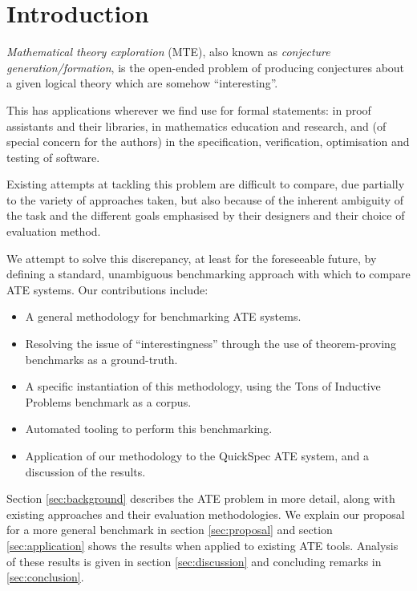 \section{Introduction}
\label{intro}


\emph{Mathematical theory exploration} (MTE), also known as
\emph{conjecture generation/formation}, is the open-ended problem of producing
conjectures about a given logical theory which are somehow ``interesting''.

This has applications wherever we find use for formal statements: in proof
assistants and their libraries, in mathematics education and research, and
(of special concern for the authors) in the specification, verification,
optimisation and testing of software.

Existing attempts at tackling this problem are difficult to compare, due
partially to the variety of approaches taken, but also because of the inherent
ambiguity of the task and the different goals emphasised by their designers and
their choice of evaluation method.

We attempt to solve this discrepancy, at least for the foreseeable future, by
defining a standard, unambiguous benchmarking approach with which to compare
ATE systems. Our contributions include:

\begin{itemize}
\item A general methodology for benchmarking ATE systems.
\item Resolving the issue of ``interestingness'' through the use of
  theorem-proving benchmarks as a ground-truth.
\item A specific instantiation of this methodology, using the Tons of Inductive
  Problems benchmark as a corpus.
\item Automated tooling to perform this benchmarking.
\item Application of our methodology to the QuickSpec ATE system, and a
  discussion of the results.
\end{itemize}

Section \ref{sec:background} describes the ATE problem in more detail, along
with existing approaches and their evaluation methodologies. We explain our
proposal for a more general benchmark in section \ref{sec:proposal} and
section \ref{sec:application} shows the results when applied to existing ATE
tools. Analysis of these results is given in section \ref{sec:discussion} and
concluding remarks in \ref{sec:conclusion}.

